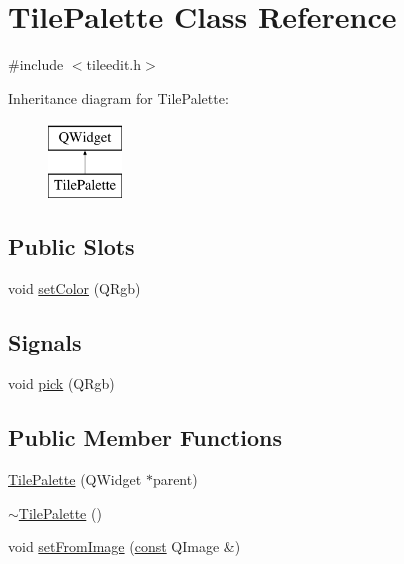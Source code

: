 \hypertarget{classTilePalette}{\section{Tile\+Palette Class Reference}
\label{classTilePalette}
}


{\ttfamily \#include $<$tileedit.\+h$>$}

Inheritance diagram for Tile\+Palette\+:\begin{figure}[H]
\begin{center}
\leavevmode
\includegraphics[height=2.000000cm]{classTilePalette}
\end{center}
\end{figure}
\subsection*{Public Slots}
\begin{DoxyCompactItemize}
\item 
void \hyperlink{classTilePalette_a74d600fc85970430a18e237d18a182c6}{set\+Color} (Q\+Rgb)
\end{DoxyCompactItemize}
\subsection*{Signals}
\begin{DoxyCompactItemize}
\item 
void \hyperlink{classTilePalette_ac822ee06129d114f2b235e883424c1b1}{pick} (Q\+Rgb)
\end{DoxyCompactItemize}
\subsection*{Public Member Functions}
\begin{DoxyCompactItemize}
\item 
\hyperlink{classTilePalette_ae5ddfb4de4630a95193d51da2b7cf1c4}{Tile\+Palette} (Q\+Widget $\ast$parent)
\item 
\hyperlink{classTilePalette_aadbf19561ecd57da3ec2749df533d4aa}{$\sim$\+Tile\+Palette} ()
\item 
void \hyperlink{classTilePalette_a00a4114f8cf27e19d200823af9e4d655}{set\+From\+Image} (\hyperlink{tradstdc_8h_a2c212835823e3c54a8ab6d95c652660e}{const} Q\+Image \&)
\end{DoxyCompactItemize}
